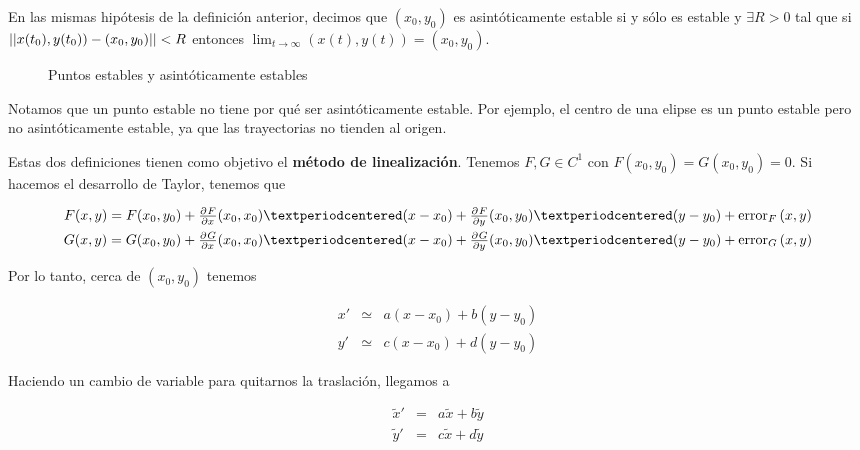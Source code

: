 \begin{definition}

En las mismas hipótesis de la definición anterior, decimos que $(x_0,y_0)$ es asintóticamente estable si y sólo es estable y $∃R>0$ tal que si $||x(t_0), y(t_0)) - (x_0,y_0)|| < R$ entonces $\lim_{t\to ∞} (x(t), y(t)) = (x_0, y_0)$.
\end{definition}

\begin{figure}[hbtp]
\caption{Puntos estables y asintóticamente estables}
\end{figure}

Notamos que un punto estable no tiene por qué ser asintóticamente estable. Por ejemplo, el centro de una elipse es un punto estable pero no asintóticamente estable, ya que las trayectorias no tienden al origen.

Estas dos definiciones tienen como objetivo el \textbf{método de linealización}. Tenemos $F,G∈C^1$ con $F(x_0,y_0) = G(x_0, y_0) = 0$. Si hacemos el desarrollo de Taylor, tenemos que 

\begin{gather*}
F(x,y) = F(x_0, y_0) + \pd{F}{x}(x_0,x_0) · (x-x_0) + \pd{F}{y}(x_0, y_0) · (y-y_0) + \mathrm{error}_F \,(x,y) \\
G(x,y) = G(x_0, y_0) + \pd{G}{x}(x_0,x_0) · (x-x_0) + \pd{G}{y}(x_0, y_0) · (y-y_0)+ \mathrm{error}_G \,(x,y)
\end{gather*}

Por lo tanto, cerca de $(x_0, y_0)$ tenemos 

\begin{equation} \label{eqML_TaylorNoErr}
\begin{matrix}
x' &\simeq&  a(x-x_0) + b(y-y_0) \\
y' &\simeq& c(x-x_0) + d(y-y_0) 
\end{matrix}
\end{equation}

Haciendo un cambio de variable para quitarnos la traslación, llegamos a 

\begin{equation} \label{eqML_Trasl}
\begin{matrix}
\tilde{x}' &=& a\tilde{x} + b \tilde{y} \\
\tilde{y}' &=& c\tilde{x} + d \tilde{y} 
\end{matrix}
\end{equation}


